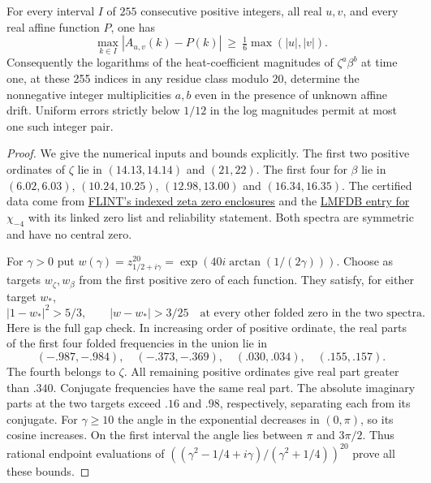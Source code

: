 \begin{theorem}\label{thm:explicit255}
For every interval $I$ of $255$ consecutive positive integers, all real
$u,v$, and every real affine function $P$, one has
\[
  \max_{k\in I}|A_{u,v}(k)-P(k)|
          \ \ge\ \tfrac16\max(|u|,|v|).
\]
Consequently the logarithms of the heat-coefficient magnitudes of
$\zeta^a\beta^b$ at time one, at these 255 indices in any residue class
modulo 20, determine the nonnegative integer multiplicities $a,b$ even
in the presence of unknown affine drift. Uniform errors strictly below
$1/12$ in the log magnitudes permit at most one such integer pair.
\end{theorem}

\begin{proof}
We give the numerical inputs and bounds explicitly. The first two positive
ordinates of $\zeta$ lie in $(14.13,14.14)$ and $(21,22)$.
The first four for $\beta$ lie in $(6.02,6.03)$, $(10.24,10.25)$,
$(12.98,13.00)$ and $(16.34,16.35)$. The certified data come from
\href{https://flintlib.org/doc/acb_dirichlet/zeta-zeros.html}{FLINT's
indexed zeta zero enclosures} and the
\href{https://www.lmfdb.org/L/1/2e2/4.3/r1/0/0}{LMFDB entry for $\chi_{-4}$}
with its linked zero list and reliability statement. Both spectra are
symmetric and have no central zero.

For $\gamma>0$ put $w(\gamma)=z_{1/2+i\gamma}^{20}
=\exp(40i\arctan(1/(2\gamma)))$.
Choose as targets $w_\zeta,w_\beta$ from the first positive zero of
each function. They satisfy, for either target $w_*$,
\begin{equation}
 |1-w_*|^2>5/3,\qquad |w-w_*|>3/25
       \quad\text{at every other folded zero in the two spectra}.
 \label{eq:boxes}
\end{equation}
Here is the full gap check. In increasing order of positive ordinate,
the real parts of the first four folded frequencies in the union lie in
\[
 (-.987,-.984),\quad (-.373,-.369),\quad
 (.030,.034),\quad (.155,.157).
\]
The fourth belongs to $\zeta$. All remaining positive ordinates give real
part greater than $.340$. Conjugate frequencies have the same real part.
The absolute imaginary parts at the two targets exceed $.16$ and $.98$,
respectively, separating each from its conjugate. For $\gamma\ge10$ the
angle in the exponential decreases in $(0,\pi)$, so its cosine increases.
On the first interval the angle lies between $\pi$ and $3\pi/2$.
Thus rational endpoint evaluations of
$((\gamma^2-1/4+i\gamma)/(\gamma^2+1/4))^{20}$ prove all these bounds.


\end{proof}

